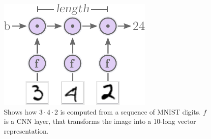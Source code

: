 \begin{figure}[H]
\centering
\includegraphics[scale=1]{graphics/mnist_sequence_problem.pdf}
\caption{Shows how $3 \cdot 4 \cdot2$ is computed from a sequence of MNIST digits. $f$ is a CNN layer, that transforms the image into a 10-long vector representation.}
\label{fig:mnist-sequence-problem}
\end{figure}


